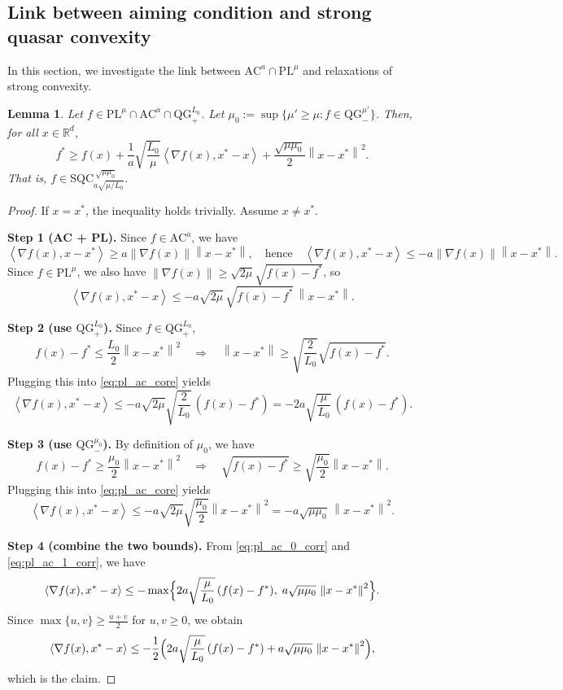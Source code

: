 \documentclass{article}
\def\R{{\mathbb{R}}}
\def\pl{{\text{PL}^\mu}}
\newcommand{\norm}[1]{\left\lVert#1\right\rVert}
\newcommand{\dotprod}[1]{\left< #1\right>}
\newcommand{\ac}{\text{AC}^{a}}
\newcommand{\qg}{\text{QG}_{+}^{L_0}}
\newcommand{\qginff}[1]{\text{QG}_{-}^{#1}}
\newcommand{\sqcf}[2]{\text{SQC}_{#1}^{#2}}
\theoremstyle{plain}
\newtheorem{lemma}[theorem]{Lemma}
\theoremstyle{definition}
\theoremstyle{remark}
\begin{document}
\subsection{Link between aiming condition and strong quasar convexity}\label{app:link}
In this section, we investigate the link between $\ac \cap \pl$ and relaxations of strong convexity. 
\begin{lemma}\label{lem:scalar_prod_bound}
Let $f \in \pl \cap \ac \cap \qg $. Let $
\mu_0 := \sup\{\mu' \ge \mu : f \in \qginff{\mu'}\}$.
Then, for all $x\in\R^d$,
\[ f^\ast \ge f(x) + \frac{1}{a}\sqrt{\frac{L_0}{\mu}}
\dotprod{\nabla f(x), x^\ast - x}
 + \frac{\sqrt{\mu \mu_0}}{2}\norm{x-x^\ast}^2.
\]
That is, $f \in \sqcf{a\sqrt{\mu/L_0}}{~ \sqrt{\mu \mu_0}}$.
\end{lemma}
\begin{proof}
If $x=x^\ast$, the inequality holds trivially. Assume $x\neq x^\ast$.

\medskip
\noindent\textbf{Step 1 (AC + PL).}
Since $f\in\ac$, we have
\[
\dotprod{\nabla f(x),x-x^\ast} \ge a \norm{\nabla f(x)}\norm{x-x^\ast},
\quad\text{hence}\quad
\dotprod{\nabla f(x),x^\ast-x} \le -a \norm{\nabla f(x)}\norm{x-x^\ast}.
\]
Since $f\in\pl$, we also have $\norm{\nabla f(x)} \ge \sqrt{2\mu}\sqrt{f(x)-f^\ast}$, so
\begin{equation}\label{eq:pl_ac_core}
\dotprod{\nabla f(x),x^\ast-x}
\le -a\sqrt{2\mu}\,\sqrt{f(x)-f^\ast}\,\norm{x-x^\ast}.
\end{equation}

\medskip
\noindent\textbf{Step 2 (use $\qg$).}
Since $f\in\qg$,
\[
f(x)-f^\ast \le \frac{L_0}{2}\norm{x-x^\ast}^2
\quad\Rightarrow\quad
\norm{x-x^\ast}\ge \sqrt{\frac{2}{L_0}}\sqrt{f(x)-f^\ast}.
\]
Plugging this into \eqref{eq:pl_ac_core} yields
\begin{equation}\label{eq:pl_ac_0_corr}
\dotprod{\nabla f(x),x^\ast-x}
\le -a\sqrt{2\mu}\sqrt{\frac{2}{L_0}}\,(f(x)-f^\ast)
= -2a\sqrt{\frac{\mu}{L_0}}\,(f(x)-f^\ast).
\end{equation}

\medskip
\noindent\textbf{Step 3 (use $\qginff{\mu_0}$).}
By definition of $\mu_0$, we have
\[
f(x)-f^\ast \ge \frac{\mu_0}{2}\norm{x-x^\ast}^2
\quad\Rightarrow\quad
\sqrt{f(x)-f^\ast}\ge \sqrt{\frac{\mu_0}{2}}\norm{x-x^\ast}.
\]
Plugging this into \eqref{eq:pl_ac_core} yields
\begin{equation}\label{eq:pl_ac_1_corr}
\dotprod{\nabla f(x),x^\ast-x}
\le -a\sqrt{2\mu}\sqrt{\frac{\mu_0}{2}}\norm{x-x^\ast}^2
= -a\sqrt{\mu \mu_0}\,\norm{x-x^\ast}^2.
\end{equation}


\medskip
\noindent\textbf{Step 4 (combine the two bounds).}
From \eqref{eq:pl_ac_0_corr} and \eqref{eq:pl_ac_1_corr}, we have
\[
\dotprod{\nabla f(x),x^\ast-x}
\le -\max\Bigl\{2a\sqrt{\frac{\mu}{L_0}}\,(f(x)-f^\ast),\; a\sqrt{\mu\mu_0}\,\norm{x-x^\ast}^2\Bigr\}.
\]
Since $\max\{u,v\}\ge \frac{u+v}{2}$ for $u,v\ge 0$, we obtain
\[
\dotprod{\nabla f(x),x^\ast-x}
\le
-\frac12\Bigl(
2a\sqrt{\frac{\mu}{L_0}}\,(f(x)-f^\ast) + a\sqrt{\mu\mu_0}\,\norm{x-x^\ast}^2
\Bigr),
\]
which is the claim.
\end{proof}
\end{document}
